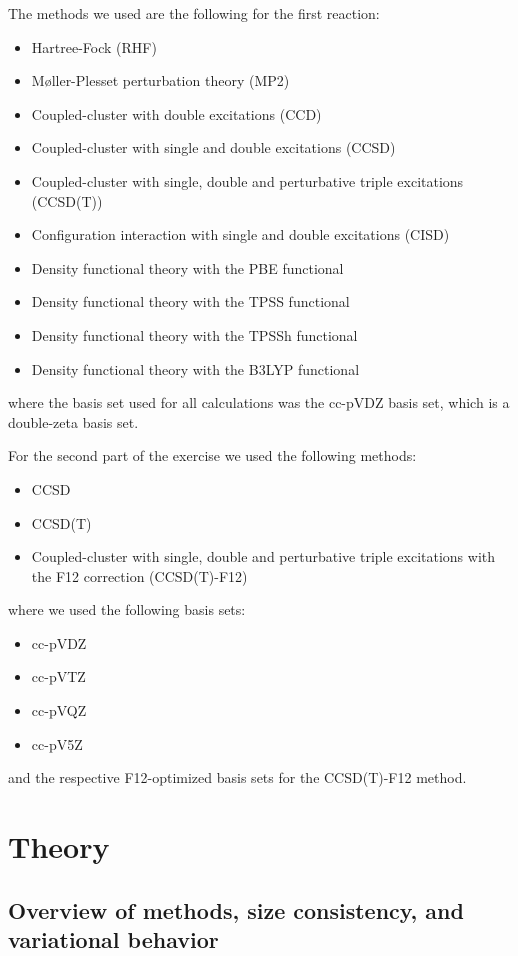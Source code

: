 \documentclass[a4paper,12pt]{scrartcl}
\begin{document}
The methods we used are the following for the first reaction:
\begin{itemize}
    \item Hartree-Fock (RHF)
    \item Møller-Plesset perturbation theory (MP2)
    \item Coupled-cluster with double excitations (CCD)
    \item Coupled-cluster with single and double excitations (CCSD)
    \item Coupled-cluster with single, double and perturbative triple excitations (CCSD(T))
    \item Configuration interaction with single and double excitations (CISD)
    \item Density functional theory with the PBE functional
    \item Density functional theory with the TPSS functional
    \item Density functional theory with the TPSSh functional
    \item Density functional theory with the B3LYP functional
\end{itemize}
where the basis set used for all calculations was the cc-pVDZ basis set, which is a double-zeta basis set.

For the second part of the exercise we used the following methods:
\begin{itemize}
    \item CCSD
    \item CCSD(T)
    \item Coupled-cluster with single, double and perturbative triple excitations with the F12 correction (CCSD(T)-F12)
\end{itemize}
where we used the following basis sets:
\begin{itemize}
    \item cc-pVDZ
    \item cc-pVTZ
    \item cc-pVQZ
    \item cc-pV5Z
\end{itemize}
and the respective F12-optimized basis sets for the CCSD(T)-F12 method.


\section{Theory}

\subsection{Overview of methods, size consistency, and variational behavior}
\end{document}
